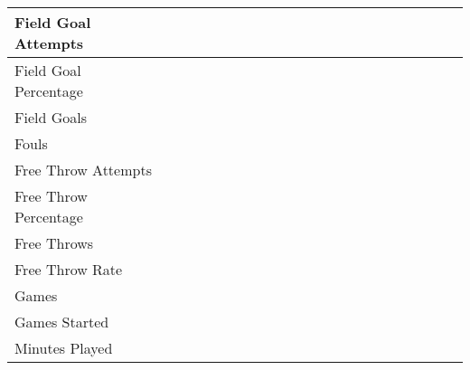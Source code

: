 \documentclass{article}
\def \cm{\checkmark}
\begin{document}
\begin{table}[ht]
\begin{tabular}{lccccccccccccccccccccc}
            \midrule
            Field Goal Attempts                 & \cm & \cm & \cm & \cm & \cm & \cm & \cm & \cm & \cm & \cm & \cm & \cm & \cm & \cm & \cm & \cm & \cm & \cm & \cm & \cm & \cm \\
            \midrule
            Field Goal Percentage               &     &     &     &     & \cm & \cm & \cm & \cm & \cm & \cm & \cm & \cm & \cm & \cm & \cm & \cm & \cm & \cm & \cm & \cm & \cm \\
            \midrule
            Field Goals                         & \cm & \cm & \cm & \cm & \cm & \cm & \cm & \cm & \cm & \cm & \cm & \cm & \cm & \cm & \cm & \cm & \cm & \cm & \cm & \cm & \cm \\
            \midrule
            Fouls                               & \cm & \cm & \cm & \cm & \cm & \cm & \cm & \cm & \cm & \cm & \cm & \cm & \cm & \cm & \cm & \cm & \cm & \cm & \cm & \cm & \cm \\
            \midrule
            Free Throw Attempts                 & \cm & \cm & \cm & \cm & \cm & \cm & \cm & \cm & \cm & \cm & \cm & \cm & \cm & \cm & \cm & \cm & \cm & \cm & \cm & \cm & \cm \\
            \midrule
            Free Throw Percentage               &     &     &     &     &     &     &     &     &     & \cm & \cm & \cm & \cm & \cm & \cm & \cm & \cm & \cm & \cm & \cm & \cm \\
            \midrule
            Free Throws                         & \cm & \cm & \cm & \cm & \cm & \cm & \cm & \cm & \cm & \cm & \cm & \cm & \cm & \cm & \cm & \cm & \cm & \cm & \cm & \cm & \cm \\
            \midrule
            Free Throw Rate                     &     &     &     &     & \cm & \cm & \cm & \cm & \cm & \cm & \cm & \cm & \cm & \cm & \cm & \cm & \cm & \cm & \cm & \cm & \cm \\
            \midrule
            Games                               & \cm & \cm & \cm & \cm & \cm & \cm & \cm & \cm & \cm & \cm & \cm & \cm & \cm & \cm & \cm & \cm & \cm & \cm & \cm & \cm & \cm \\
            \midrule
            Games Started                       &     &     &     &     &     &     &     &     &     &     &     &     &     &     &     &     &     &     &     & \cm & \cm \\
            \midrule
            Minutes Played                      &     &     &     &     &     &     &     & \cm & \cm & \cm & \cm & \cm & \cm & \cm & \cm & \cm & \cm & \cm & \cm & \cm & \cm \\

\end{tabular}
\end{table}
\end{document}
